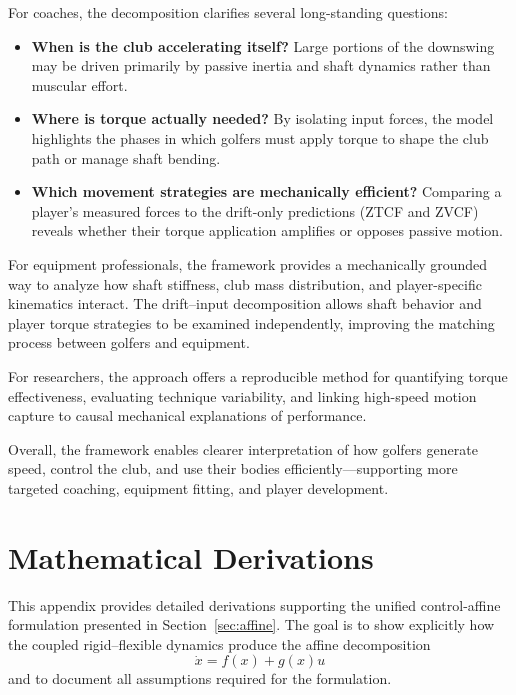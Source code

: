 \documentclass[12pt]{article}
\begin{document}
For coaches, the decomposition clarifies several long-standing questions:
\begin{itemize}
  \item \textbf{When is the club accelerating itself?}  
  Large portions of the downswing may be driven primarily by passive inertia and shaft dynamics rather than muscular effort.
  \item \textbf{Where is torque actually needed?}  
  By isolating input forces, the model highlights the phases in which golfers must apply torque to shape the club path or manage shaft bending.
  \item \textbf{Which movement strategies are mechanically efficient?}  
  Comparing a player’s measured forces to the drift-only predictions (ZTCF and ZVCF) reveals whether their torque application amplifies or opposes passive motion.
\end{itemize}

For equipment professionals, the framework provides a mechanically grounded way to analyze how shaft stiffness, club mass distribution, and player-specific kinematics interact. The drift--input decomposition allows shaft behavior and player torque strategies to be examined independently, improving the matching process between golfers and equipment.

For researchers, the approach offers a reproducible method for quantifying torque effectiveness, evaluating technique variability, and linking high-speed motion capture to causal mechanical explanations of performance.

Overall, the framework enables clearer interpretation of how golfers generate speed, control the club, and use their bodies efficiently—supporting more targeted coaching, equipment fitting, and player development.

\appendix

\section{Mathematical Derivations}
\label{app:derivations}


This appendix provides detailed derivations supporting the unified control-affine formulation presented in Section~\ref{sec:affine}. The goal is to show explicitly how the coupled rigid--flexible dynamics produce the affine decomposition
\[
  \dot{x} = f(x) + g(x)u
\]
and to document all assumptions required for the formulation.
\end{document}
